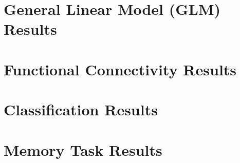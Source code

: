 \section{General Linear Model (GLM) Results}
\section{Functional Connectivity Results}
\section{Classification Results}
\section{Memory Task Results}